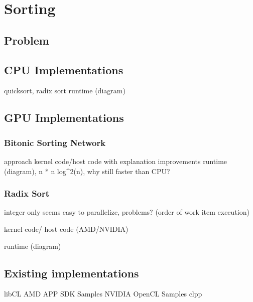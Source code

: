 \section{Sorting}

\subsection{Problem}

\subsection{CPU Implementations}
quicksort, radix sort
runtime (diagram)

\subsection{GPU Implementations}

\subsubsection{Bitonic Sorting Network}
approach
kernel code/host code with explanation
improvements
runtime (diagram), n * n log^2(n), why still faster than CPU?

\subsubsection{Radix Sort}
integer only
seems easy to parallelize, problems? (order of work item execution)

kernel code/ host code (AMD/NVIDIA)

runtime (diagram)

\subsection{Existing implementations}
libCL
AMD APP SDK Samples
NVIDIA OpenCL Samples
clpp
